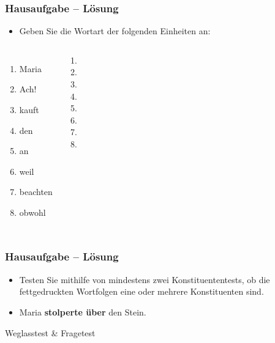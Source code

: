 

\begin{frame}
\frametitle{Hausaufgabe -- Lösung}

\begin{itemize}
	\item Geben Sie die Wortart der folgenden Einheiten an:
\end{itemize}

\begin{columns}
	\begin{enumerate}
		\item Maria
		\item Ach!
		\item kauft
		\item den
		\item an
		\item weil
		\item beachten
		\item obwohl
	\end{enumerate}
	

\pause
	
	\begin{enumerate}
		\item[\ras] 
		\item[\ras] 
		\item[\ras] 
		\item[\ras] 
		\item[\ras] 
		\item[\ras] 
		\item[\ras] 
		\item[\ras] 
	\end{enumerate}
\end{columns}

\end{frame}
	
	
	\begin{frame}
	\frametitle{Hausaufgabe -- Lösung}
	
	
	\begin{itemize}
		\item Testen Sie mithilfe von mindestens zwei Konstituententests, ob die fettgedruckten Wortfolgen eine oder mehrere Konstituenten sind.
		
		\vspace{.5cm}
		
		\item[] Maria \textbf{stolperte über} den Stein.
	\end{itemize}
	
	\pause 
	
	\ea Weglasstest \& Fragetest \ras {}
	\z 
	\z
	
\end{frame}


